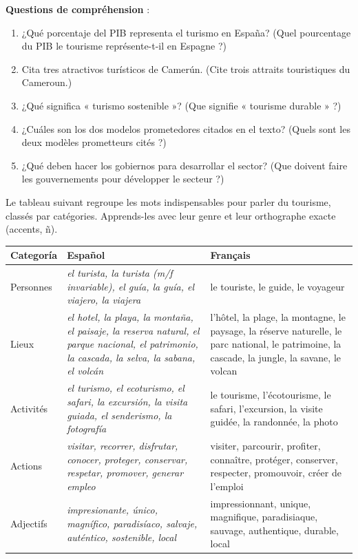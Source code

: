 \documentclass[11pt]{article}
\newcounter{popsec}
\newcounter{popsub}
\newcommand{\courssub}[1]{%
  \stepcounter{popsub}%
  \par\vspace{9pt}\noindent{\popxbold\fontsize{11.5}{13}\selectfont\color{popink}{\color{poporange}\thepopsec.\thepopsub}\hspace{6pt}#1}\par\nopagebreak\vspace{4pt}
}
\newcommand{\esp}[1]{\ifmmode\text{\textit{#1}}\else\begingroup\selectlanguage{spanish}\itshape #1\endgroup\fi}
\begin{document}
\textbf{Questions de compréhension} :
\begin{enumerate}
\item ¿Qué porcentaje del PIB representa el turismo en España? (Quel pourcentage du PIB le tourisme représente-t-il en Espagne ?)
\item Cita tres atractivos turísticos de Camerún. (Cite trois attraits touristiques du Cameroun.)
\item ¿Qué significa « turismo sostenible »? (Que signifie « tourisme durable » ?)
\item ¿Cuáles son los dos modelos prometedores citados en el texto? (Quels sont les deux modèles prometteurs cités ?)
\item ¿Qué deben hacer los gobiernos para desarrollar el sector? (Que doivent faire les gouvernements pour développer le secteur ?)
\end{enumerate}

\courssub{Lexique thématique du tourisme}

\begin{definition}
Le tableau suivant regroupe les mots indispensables pour parler du tourisme, classés par catégories. Apprends-les avec leur genre et leur orthographe exacte (accents, \~n).
\end{definition}

\begin{center}
\begin{tabularx}{\linewidth}{|l|X|X|}\hline
\rowcolor{popblueL} \textbf{Categoría} & \textbf{Español} & \textbf{Français} \\ \hline
Personnes & \esp{el turista, la turista} (m/f invariable), \esp{el guía, la guía}, \esp{el viajero, la viajera} & le touriste, le guide, le voyageur \\ \hline
Lieux & \esp{el hotel}, \esp{la playa}, \esp{la montaña}, \esp{el paisaje}, \esp{la reserva natural}, \esp{el parque nacional}, \esp{el patrimonio}, \esp{la cascada}, \esp{la selva}, \esp{la sabana}, \esp{el volcán} & l'hôtel, la plage, la montagne, le paysage, la réserve naturelle, le parc national, le patrimoine, la cascade, la jungle, la savane, le volcan \\ \hline
Activités & \esp{el turismo}, \esp{el ecoturismo}, \esp{el safari}, \esp{la excursión}, \esp{la visita guiada}, \esp{el senderismo}, \esp{la fotografía} & le tourisme, l'écotourisme, le safari, l'excursion, la visite guidée, la randonnée, la photo \\ \hline
Actions & \esp{visitar}, \esp{recorrer}, \esp{disfrutar}, \esp{conocer}, \esp{proteger}, \esp{conservar}, \esp{respetar}, \esp{promover}, \esp{generar empleo} & visiter, parcourir, profiter, connaître, protéger, conserver, respecter, promouvoir, créer de l'emploi \\ \hline
Adjectifs & \esp{impresionante}, \esp{único}, \esp{magnífico}, \esp{paradisíaco}, \esp{salvaje}, \esp{auténtico}, \esp{sostenible}, \esp{local} & impressionnant, unique, magnifique, paradisiaque, sauvage, authentique, durable, local \\ \hline
\end{tabularx}
\end{center}
\end{document}
